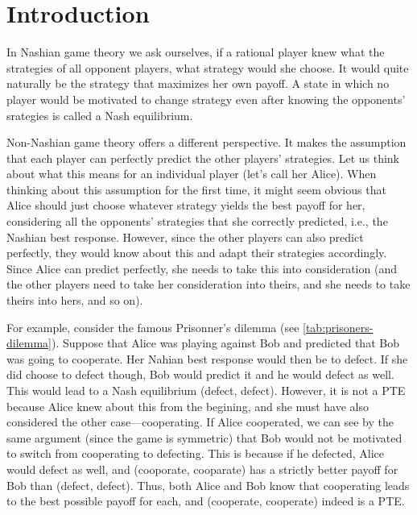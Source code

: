 \chapter{Introduction}
In Nashian game theory we ask ourselves, if a rational player knew what the strategies of all opponent players, what strategy would she choose.
It would quite naturally be the strategy that maximizes her own payoff.
A state in which no player would be motivated to change strategy even after knowing the opponents' srategies is called a Nash equilibrium.

Non-Nashian game theory offers a different perspective.
It makes the assumption that each player can perfectly predict the other players' strategies.
Let us think about what this means for an individual player (let's call her Alice).
When thinking about this assumption for the first time, it might seem obvious that Alice should just choose whatever strategy yields the best payoff for her, considering all the opponents' strategies that she correctly predicted, i.e., the Nashian best response.
However, since the other players can also predict perfectly, they would know about this and adapt their strategies accordingly.
Since Alice can predict perfectly, she needs to take this into consideration (and the other players need to take her consideration into theirs, and she needs to take theirs into hers, and so on).

For example, consider the famous Prisonner's dilemma (see \autoref{tab:prisoners-dilemma}).
Suppose that Alice was playing against Bob and predicted that Bob was going to cooperate.
Her Nahian best response would then be to defect.
If she did choose to defect though, Bob would predict it and he would defect as well.
This would lead to a Nash equilibrium (defect, defect).
However, it is not a PTE because Alice knew about this from the begining, and she must have also considered the other case---cooperating.
If Alice cooperated, we can see by the same argument (since the game is symmetric) that Bob would not be motivated to switch from cooperating to defecting.
This is because if he defected, Alice would defect as well, and (cooporate, cooparate) has a strictly better payoff for Bob than (defect, defect).
Thus, both Alice and Bob know that cooperating leads to the best possible payoff for each, and (cooperate, cooperate) indeed is a PTE.

